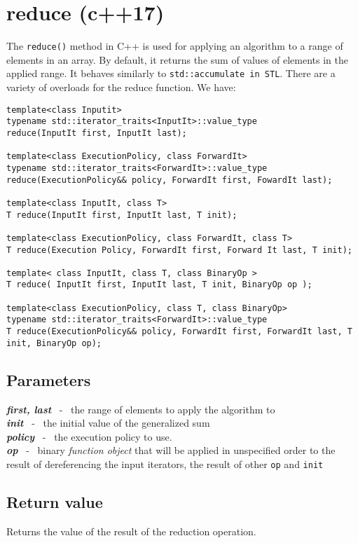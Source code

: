 \documentclass{report}
\begin{document}
    \section{reduce (c++17)}
    The \texttt{reduce()} method in C++ is used for applying an algorithm to a range of elements in an array. By default, it returns the sum of values of elements in the applied range. It behaves similarly to \texttt{std::accumulate in STL}.
    \bigbreak \noindent
    There are a variety of overloads for the reduce function. We have:
    \begin{verbatim}
template<class Inputit>
typename std::iterator_traits<InputIt>::value_type
reduce(InputIt first, InputIt last);
     
template<class ExecutionPolicy, class ForwardIt>
typename std::iterator_traits<ForwardIt>::value_type
reduce(ExecutionPolicy&& policy, ForwardIt first, FowardIt last);
    
template<class InputIt, class T>
T reduce(InputIt first, InputIt last, T init);

template<class ExecutionPolicy, class ForwardIt, class T>
T reduce(Execution Policy, ForwardIt first, Forward It last, T init);

template< class InputIt, class T, class BinaryOp >
T reduce( InputIt first, InputIt last, T init, BinaryOp op );
    
template<class ExecutionPolicy, class T, class BinaryOp>
typename std::iterator_traits<ForwardIt>::value_type
T reduce(ExecutionPolicy&& policy, ForwardIt first, ForwardIt last, T init, BinaryOp op);
    \end{verbatim}
    \subsection*{Parameters}
    \textit{\textbf{first, last}}  \ - \ the range of elements to apply the algorithm to \vspace{1.5mm} \\ 
    \textit{\textbf{init}} \ - \ the initial value of the generalized sum \vspace{1.5mm} \\
    \textit{\textbf{policy}} \ - \ the execution policy to use. \vspace{1.5mm} \\
    \textit{\textbf{op}} \ - \ binary \textit{function object} that will be applied in unspecified order to the result of dereferencing the input iterators, the result of other \texttt{op} and \texttt{init}
\subsection*{Return value}
Returns the value of the result of the reduction operation.
\end{document}
